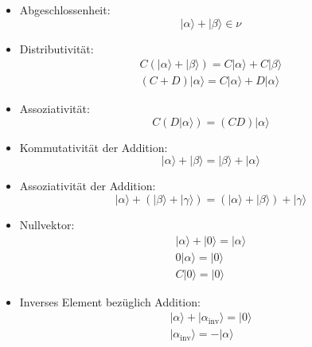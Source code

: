 \documentclass[10pt,article,colorback,accentcolor=tud9d]{scrartcl}
\begin{document}
\begin{itemize}
\begin{itemize}
\item Abgeschlossenheit: 
\begin{equation} 
\left| \alpha \rangle \right.+\left|\beta\rangle \right. \in \nu
\end{equation}
\item Distributivität: 
\begin{equation}
\begin{aligned}
C(\left|\alpha\rangle \right. +\left|\beta\rangle \right.) = C\left|\alpha\rangle \right. +C\left|
\beta\rangle \right.\\
(C+D)\left|\alpha\rangle \right. = C\left|\alpha\rangle \right. +D\left|\alpha\rangle \right.
\end{aligned}
\end{equation}
\item Assoziativität: 
\begin{equation}
C(D\left|\alpha\rangle \right.)=(CD)\left|\alpha\rangle \right.
\end{equation}
\item Kommutativität der Addition: 
\begin{equation}
\left|\alpha\rangle \right. + \left|\beta\rangle \right. =\left|\beta\rangle \right. + \left|\alpha
\rangle \right.
\end{equation}
\item Assoziativität der Addition: 
\begin{equation}
\left|\alpha\rangle \right. + (\left|\beta\rangle \right. + \left|\gamma\rangle \right.) = (\left|
\alpha\rangle \right. + \left|\beta\rangle \right.)+\left|\gamma\rangle \right.
\end{equation}
\item Nullvektor: 
\begin{equation}
\begin{aligned}
\left|\alpha\rangle \right. +\left|0\rangle \right. = \left|\alpha\rangle \right.\\
0 \left|\alpha\rangle \right. = \left|0\rangle \right.\\
C \left|0\rangle \right. = \left|0\rangle \right.
\end{aligned}
\end{equation}
\item Inverses Element bezüglich Addition:
\begin{equation}
\begin{aligned}
\left|\alpha\rangle \right. + \left|{\alpha}_\text{inv}\rangle \right. = \left|0\rangle \right.\\
\left|{\alpha}_\text{inv}\rangle \right. = -\left|\alpha\rangle \right.
\end{aligned}
\end{equation}
\end{itemize}
 

\end{itemize}
\end{document}
